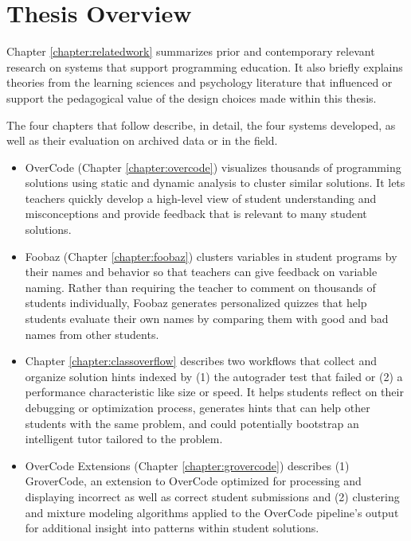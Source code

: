 \section{Thesis Overview}

Chapter \ref{chapter:relatedwork} summarizes prior and contemporary relevant research on systems that support programming education. It also briefly explains theories from the learning sciences and psychology literature that influenced or support the pedagogical value of the design choices made within this thesis.

The four chapters that follow describe, in detail, the four systems developed, as well as their evaluation on archived data or in the field.

\begin{itemize}
\item OverCode (Chapter \ref{chapter:overcode}) visualizes thousands of programming solutions using static and dynamic analysis to cluster similar solutions. It lets teachers quickly develop a high-level view of student understanding and misconceptions and provide feedback that is relevant to many student solutions. 

\item Foobaz (Chapter \ref{chapter:foobaz}) clusters variables in student programs by their names and behavior so that teachers can give feedback on variable naming. Rather than requiring the teacher to comment on thousands of students individually, Foobaz generates personalized quizzes that help students evaluate their own names by comparing them with good and bad names from other students. 

\item Chapter \ref{chapter:classoverflow} describes two workflows that collect and organize solution hints indexed by (1) the autograder test that failed or (2) a performance characteristic like size or speed. It helps students reflect on their debugging or optimization process, generates hints that can help other students with the same problem, and could potentially bootstrap an intelligent tutor tailored to the problem.

\item OverCode Extensions (Chapter \ref{chapter:grovercode}) describes (1) GroverCode, an extension to OverCode optimized for processing and displaying incorrect as well as correct student submissions and (2) clustering and mixture modeling algorithms applied to the OverCode pipeline's output for additional insight into patterns within student solutions. 
\end{itemize}

